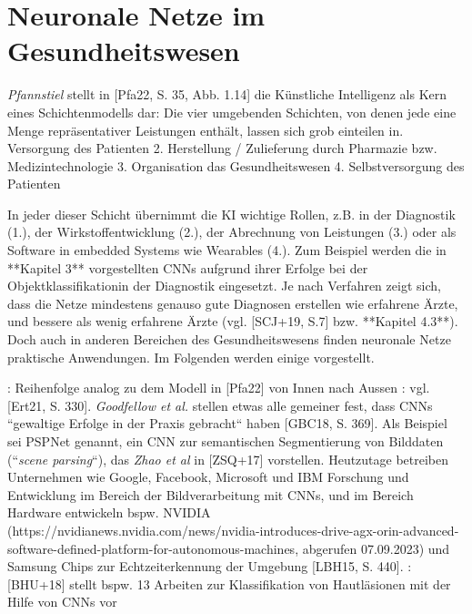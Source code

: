 \chapter{Neuronale Netze im Gesundheitswesen}



\textit{Pfannstiel} stellt in [Pfa22, S. 35, Abb. 1.14] die Künstliche Intelligenz als Kern eines Schichtenmodells dar: Die vier umgebenden Schichten, von denen jede eine Menge repräsentativer Leistungen enthält, lassen sich grob einteilen in. Versorgung des Patienten
2. Herstellung / Zulieferung durch Pharmazie bzw. Medizintechnologie
3. Organisation das Gesundheitswesen
4. Selbstversorgung des Patienten

In jeder dieser Schicht übernimmt die KI wichtige Rollen, z.B. in der Diagnostik (1.), der Wirkstoffentwicklung (2.), der Abrechnung von Leistungen (3.) oder als Software in embedded Systems wie Wearables (4.). Zum Beispiel werden die in **Kapitel 3** vorgestellten CNNs aufgrund ihrer Erfolge bei der Objektklassifikation\footnotemark[2] in der Diagnostik eingesetzt\footnotemark[3]. Je nach Verfahren zeigt sich, dass die Netze mindestens genauso gute Diagnosen erstellen wie erfahrene Ärzte, und bessere als wenig erfahrene Ärzte (vgl. [SCJ+19, S.7] bzw. **Kapitel 4.3**). Doch auch in anderen Bereichen des Gesundheitswesens finden neuronale Netze praktische Anwendungen. Im Folgenden werden einige vorgestellt.

\footnotemark[1]: Reihenfolge analog zu dem Modell in [Pfa22] von Innen nach Aussen
\footnotemark[2]: vgl. [Ert21, S. 330]. \textit{Goodfellow et al.} stellen etwas alle gemeiner fest, dass CNNs ``gewaltige Erfolge in der Praxis gebracht`` haben [GBC18, S. 369]. Als Beispiel sei PSPNet genannt, ein CNN zur semantischen Segmentierung von Bilddaten (``\textit{scene parsing}``), das \textit{Zhao et al} in [ZSQ+17] vorstellen. Heutzutage betreiben Unternehmen wie Google, Facebook, Microsoft und IBM Forschung und Entwicklung im Bereich der Bildverarbeitung mit CNNs, und im Bereich Hardware entwickeln bspw. NVIDIA (https://nvidianews.nvidia.com/news/nvidia-introduces-drive-agx-orin-advanced-software-defined-platform-for-autonomous-machines, abgerufen 07.09.2023) und Samsung Chips zur Echtzeiterkennung der Umgebung  [LBH15, S. 440].
\footnotemark[3]: [BHU+18] stellt bspw. 13 Arbeiten zur Klassifikation von Hautläsionen mit der Hilfe von CNNs vor



